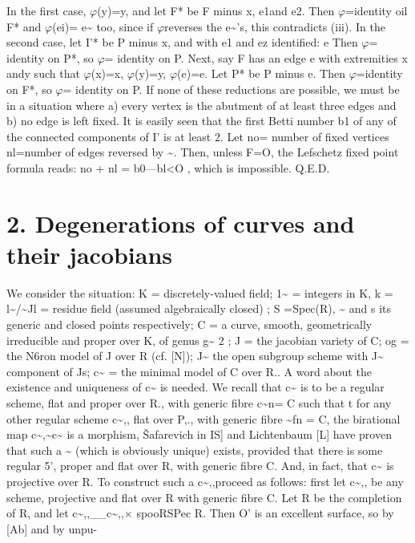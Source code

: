 \documentclass[11pt]{article}
\theoremstyle{plain}
\theoremstyle{definition}
\theoremstyle{remark}
\begin{document}
In the first case, $\varphi$(y)=y, and let F* be F minus x, e1and e2. Then $\varphi$=identity oil F* and $\varphi$(ei)= e\textasciitilde{} too, since if $\varphi$reverses the e\textasciitilde{}'s, this contradicts (iii). In the second case, let I'* be P minus x, and with e1 and ez identified: e Then $\varphi$= identity on P*, so $\varphi$= identity on P. Next, say F has an edge e with extremities x andy such that $\varphi$(x)=x, $\varphi$(y)=y, $\varphi$(e)=e. Let P* be P minus e. Then $\varphi$=identity on F*, so $\varphi$= identity on P. If none of these reductions are possible, we must be in a situation where a) every vertex is the abutment of at least three edges and b) no edge is left fixed. It is easily seen that the first Betti number b1 of any of the connected components of I' is at least 2. Let no= number of fixed vertices nl=number of edges reversed by \textasciitilde{}. Then, unless F=O, the Lefschetz fixed point formula reads: no + nl = b0---bl<O , which is impossible. Q.E.D.

\section*{2. Degenerations of curves and their jacobians}
We consider the situation: K = discretely-valued field; 1\textasciitilde{} = integers in K, k = l\textasciitilde{}/\textasciitilde{}Jl = residue field (assumed algebraically closed) ; S =Spec(R), \textasciitilde{} and s its generic and closed points respectively; C = a curve, smooth, geometrically irreducible and proper over K, of genus g\textasciitilde{} 2 ; J = the jacobian variety of C; og = the N6ron model of J over R (cf. [N]); J\textasciitilde{} the open subgroup scheme with J\textasciitilde{} component of Js; c\textasciitilde{} = the minimal model of C over R.. A word about the existence and uniqueness of c\textasciitilde{} is needed. We recall that c\textasciitilde{} is to be a regular scheme, flat and proper over R., with generic fibre c\textasciitilde{}n= C such that t for any other regular scheme c\textasciitilde{},, flat over P,., with generic fibre \textasciitilde{}fn = C, the birational map c\textasciitilde{},\textasciitilde{}c\textasciitilde{} is a morphism, \v{S}afarevich in IS] and Lichtenbaum [L] have proven that such a \textasciitilde{} (which is obviously unique) exists, provided that there is some regular 5', proper and flat over R, with generic fibre C. And, in fact, that c\textasciitilde{} is projective over R. To construct such a c\textasciitilde{},,proceed as follows: first let c\textasciitilde{},, be any scheme, projective and flat over R with generic fibre C. Let R be the completion of R, and let c\textasciitilde{},,\_\_c\textasciitilde{},,$\times$ spooRSPec R. Then O' is an excellent surface, so by [Ab] and by unpu-
\end{document}
